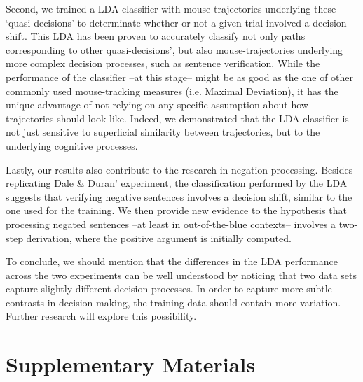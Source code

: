 \documentclass{article}
\begin{document}
Second, we trained a LDA classifier with mouse-trajectories underlying these `quasi-decisions' to determinate whether or not a given trial involved a decision shift. 
This LDA has been proven to accurately classify not only paths corresponding to other quasi-decisions', but also mouse-trajectories underlying more complex decision processes, such as sentence verification. While the performance of the classifier --at this stage-- might be as good as the one of other commonly used mouse-tracking measures (i.e. Maximal Deviation), it has the unique advantage of not relying on any specific assumption about how trajectories should look like. Indeed, we demonstrated that the LDA classifier is not just sensitive to superficial similarity between trajectories, but to the underlying cognitive processes. 

Lastly, our results also contribute to the research in negation processing. Besides replicating Dale \& Duran' experiment, the classification performed by the LDA suggests that verifying negative sentences involves a decision shift, similar to the one used for the training. We then provide new evidence to the hypothesis that processing negated sentences --at least in out-of-the-blue contexts-- involves a two-step derivation, where the positive argument is initially computed.  

%

To conclude, we should mention that the differences in the LDA performance across the two experiments can be well understood by noticing that two data sets capture slightly different decision processes. In order to capture more subtle contrasts in decision making, the training data should contain more variation. Further research will explore this possibility. 
    




\section{Supplementary Materials}
\end{document}
